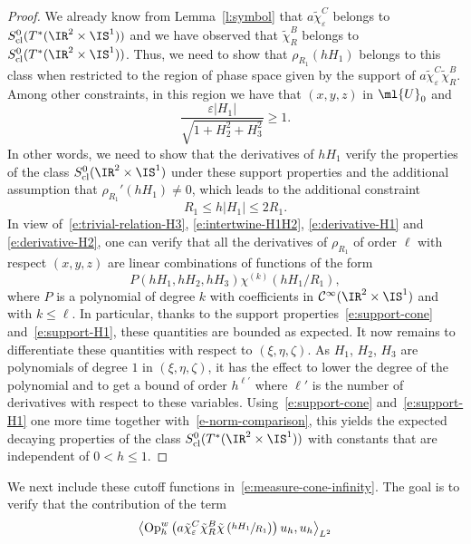 \documentclass[10pt]{amsart}
\theoremstyle{plain}
\theoremstyle{definition}
\theoremstyle{remark}
\newcommand{\Op}{\operatorname{Op}}
\begin{document}
\begin{proof}
We already know from Lemma~\ref{l:symbol} that $a\tilde{\chi}_\varepsilon^C$ belongs to $S_{\operatorname{cl}}^0(T^*(\IR^2\times\IS^1))$ and we have observed that $\tilde{\chi}_R^B$ belongs to $S_{\operatorname{cl}}^0(T^*(\IR^2\times\IS^1))$. Thus, we need to show that $\rho_{R_1}(hH_1)$ belongs to this class when restricted to the region of phase space given by the support of $a\tilde{\chi}_\varepsilon^C\tilde{\chi}_R^B$. Among other constraints, in this region we have that $(x,y,z)$ in $\ml{U}_0$ and
\begin{equation}\label{e:support-cone}
\frac{\varepsilon |H_1|}{\sqrt{1+H_2^2+H_3^2}}\geq 1.
\end{equation}
In other words, we need to show that the derivatives of $hH_1$ verify the properties of the class $S^{0}_{\textup{cl}}(\IR^2\times\IS^1)$ under these support properties and the additional assumption that $\rho_{R_1}'(hH_1)\neq 0$, which leads to the additional constraint
\begin{equation}\label{e:support-H1}
R_1\leq h|H_1|\leq 2R_1.
\end{equation}
In view of~\eqref{e:trivial-relation-H3}, \eqref{e:intertwine-H1H2}, \eqref{e:derivative-H1} and \eqref{e:derivative-H2}, one can verify that all the derivatives of $\rho_{R_1}$ of order $\ell$ with respect $(x,y,z)$ are linear combinations of functions of the form
\[
P(hH_1,hH_2,hH_3)\chi^{(k)}(hH_1/R_1),
\]
where $P$ is a polynomial of degree $k$ with coefficients in $\mathcal{C}^{\infty}(\IR^2\times\IS^1)$ and with $k\leq \ell$. In particular, thanks to the support properties~\eqref{e:support-cone} and~\eqref{e:support-H1}, these quantities are bounded as expected. It now remains to differentiate these quantities with respect to $(\xi,\eta,\zeta)$. As $H_1$, $H_2$, $H_3$ are polynomials of degree $1$ in $(\xi,\eta,\zeta)$, it has the effect to lower the degree of the polynomial and to get a bound of order $h^{\ell'}$ where $\ell'$ is the number of derivatives with respect to these variables. Using~\eqref{e:support-cone} and~\eqref{e:support-H1} one more time together with~\eqref{e-norm-comparison}, this yields the expected decaying properties of the class $S_{\operatorname{cl}}^0(T^*(\IR^2\times\IS^1))$ with constants that are independent of $0<h\leq 1$.
\end{proof}
We next include these cutoff functions in~\eqref{e:measure-cone-infinity}. The goal is to verify that the contribution of the term
\begin{equation}%
\left\langle \Op_h^w\left(a\tilde{\chi}_\varepsilon^C\tilde{\chi}_R^B\tilde{\chi}\left(\sfrac{hH_1}{R_1}\right)\right)u_h,u_h\right\rangle_{L^2}
\end{equation}
\end{document}
